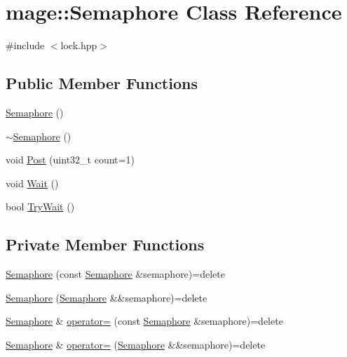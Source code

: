 \hypertarget{classmage_1_1_semaphore}{}\section{mage\+:\+:Semaphore Class Reference}
\label{classmage_1_1_semaphore}


{\ttfamily \#include $<$lock.\+hpp$>$}

\subsection*{Public Member Functions}
\begin{DoxyCompactItemize}
\item 
\hyperlink{classmage_1_1_semaphore_a7b4f53c18b9a244ed98ef58fa5cfa2bb}{Semaphore} ()
\item 
\hyperlink{classmage_1_1_semaphore_a991ed365c28e4a9c63ff34a5efeb012d}{$\sim$\+Semaphore} ()
\item 
void \hyperlink{classmage_1_1_semaphore_a354ea9743f9794b14a3f032e0443b214}{Post} (uint32\+\_\+t count=1)
\item 
void \hyperlink{classmage_1_1_semaphore_ae63599939b6bcc3939cbeddd7ffa5f66}{Wait} ()
\item 
bool \hyperlink{classmage_1_1_semaphore_ab34cdf4e9b7388dbdb30aab167c074f6}{Try\+Wait} ()
\end{DoxyCompactItemize}
\subsection*{Private Member Functions}
\begin{DoxyCompactItemize}
\item 
\hyperlink{classmage_1_1_semaphore_a8873b2ed82ff66d323a8c3cebf0fb5c0}{Semaphore} (const \hyperlink{classmage_1_1_semaphore}{Semaphore} \&semaphore)=delete
\item 
\hyperlink{classmage_1_1_semaphore_a48c70e46bdfd206556a93ae96ad760a5}{Semaphore} (\hyperlink{classmage_1_1_semaphore}{Semaphore} \&\&semaphore)=delete
\item 
\hyperlink{classmage_1_1_semaphore}{Semaphore} \& \hyperlink{classmage_1_1_semaphore_af3308cf7fa1ed33cda0ee53b9565f658}{operator=} (const \hyperlink{classmage_1_1_semaphore}{Semaphore} \&semaphore)=delete
\item 
\hyperlink{classmage_1_1_semaphore}{Semaphore} \& \hyperlink{classmage_1_1_semaphore_a7ce33136147e745f75d51abc77cd845c}{operator=} (\hyperlink{classmage_1_1_semaphore}{Semaphore} \&\&semaphore)=delete
\end{DoxyCompactItemize}
